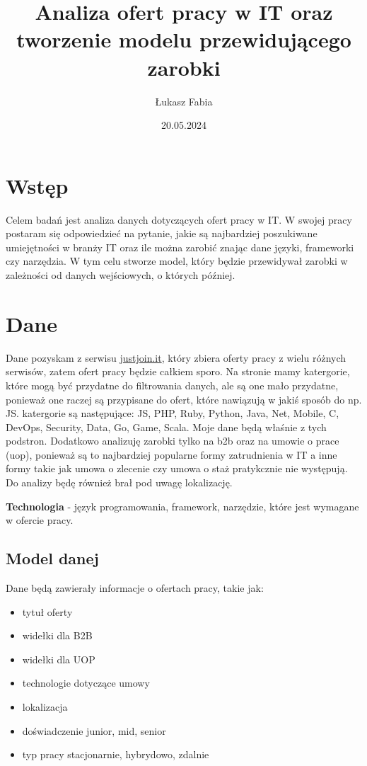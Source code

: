 \documentclass[a4paper]{article}
\title{Analiza ofert pracy w IT oraz tworzenie modelu przewidującego zarobki}
\author{Łukasz Fabia}
\date{20.05.2024}
\begin{document}
\maketitle
\tableofcontents

\section{Wstęp}

\quad Celem badań jest analiza danych dotyczących ofert pracy w IT. W swojej pracy postaram się
odpowiedzieć na pytanie, jakie są najbardziej poszukiwane umiejętności w branży IT oraz ile można zarobić
znając dane języki, frameworki czy narzędzia. W tym celu stworze model, który będzie przewidywał zarobki w zależności od danych wejściowych,
o których później.


\section{Dane}

\quad Dane pozyskam z serwisu \href{https://justjoin.it/}{justjoin.it}, który zbiera oferty pracy z wielu różnych serwisów, zatem
ofert pracy będzie całkiem sporo. Na stronie mamy katergorie, które mogą być przydatne do filtrowania danych, ale są one mało przydatne, ponieważ one raczej są przypisane do ofert, które nawiązują w jakiś sposób do np. JS. katergorie są następujące:
JS, PHP, Ruby, Python, Java, Net, Mobile, C, DevOps, Security, Data, Go, Game, Scala. Moje dane będą właśnie z tych podstron.
\quad Dodatkowo analizuję zarobki tylko na b2b oraz na umowie o prace (uop), ponieważ są to najbardziej popularne formy zatrudnienia w IT a inne formy takie jak umowa o zlecenie czy umowa o staż pratykcznie nie występują. Do analizy będę również brał pod uwagę lokalizację.

\textbf{\newline Technologia} - język programowania, framework, narzędzie, które jest wymagane w ofercie pracy.

\subsection{Model danej}
\quad Dane będą zawierały informacje o ofertach pracy, takie jak:
\begin{itemize}
    \item tytuł oferty
    \item widełki dla B2B
    \item widełki dla UOP
    \item technologie dotyczące umowy
    \item lokalizacja
    \item doświadczenie {junior, mid, senior}
    \item typ pracy {stacjonarnie, hybrydowo, zdalnie}
\end{itemize}
\end{document}
